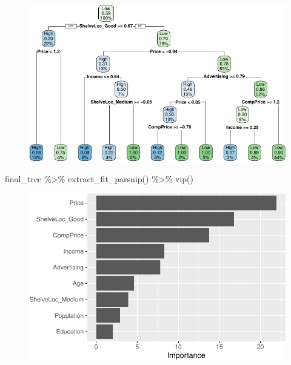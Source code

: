\documentclass[
]{article}
\newenvironment{Shaded}{\begin{snugshade}}{\end{snugshade}}
\newcommand{\FunctionTok}[1]{\textcolor[rgb]{0.28,0.35,0.67}{#1}}
\newcommand{\NormalTok}[1]{\textcolor[rgb]{0.00,0.23,0.31}{#1}}
\newcommand{\SpecialCharTok}[1]{\textcolor[rgb]{0.37,0.37,0.37}{#1}}
\begin{document}
\begin{figure}[H]

{\centering \includegraphics{hw4_files/figure-pdf/unnamed-chunk-29-1.pdf}

}

\end{figure}

\begin{Shaded}
\begin{Highlighting}[]
\NormalTok{final\_tree }\SpecialCharTok{\%\textgreater{}\%} 
  \FunctionTok{extract\_fit\_parsnip}\NormalTok{() }\SpecialCharTok{\%\textgreater{}\%} 
  \FunctionTok{vip}\NormalTok{()}
\end{Highlighting}
\end{Shaded}

\begin{figure}[H]

{\centering \includegraphics{hw4_files/figure-pdf/unnamed-chunk-29-2.pdf}

}

\end{figure}
\end{document}
